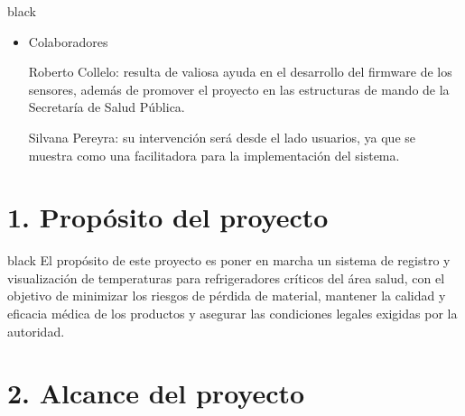 \documentclass[11pt]{charter}
\begin{document}
\begin{consigna}{black}
 
\begin{itemize}
\item Colaboradores

Roberto Collelo: resulta de valiosa ayuda en el desarrollo del firmware de los sensores, además de promover el proyecto en las estructuras de mando de la Secretaría de Salud Pública.

Silvana Pereyra: su intervención será desde el lado usuarios, ya que se muestra como una facilitadora para la implementación del sistema.
\end{itemize}

\end{consigna}



\section{1. Propósito del proyecto}
\label{sec:proposito}

\begin{consigna}{black}
El propósito de este proyecto es poner en marcha un sistema de registro y visualización de temperaturas para refrigeradores críticos del área salud, con el objetivo de minimizar los riesgos de pérdida de material, mantener la calidad y eficacia médica de los productos y asegurar las condiciones legales exigidas por la autoridad.
\end{consigna}

\section{2. Alcance del proyecto}
\label{sec:alcance}
\end{document}
